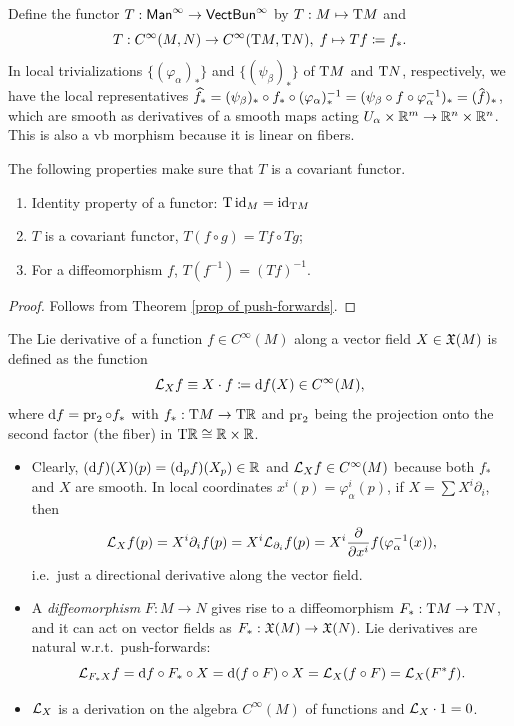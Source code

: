 \begin{defn}
Define the functor $T:\mathsf{Man}^\infty \to \mathsf{VectBun}^\infty$ by $T:M\mapsto \mathrm{T} M$ and \[T:C^\infty(M,N)\to C^\infty(\mathrm{T} M,\mathrm{T} N),\; f\mapsto Tf\coloneqq f_\ast.\]
In local trivializations $\{(\varphi_\alpha)_\ast\}$ and $\{(\psi_\beta)_\ast\}$ of $\mathrm{T} M$ and $\mathrm{T} N$, respectively, we have the local representatives $\widehat{ f_\ast}=(\psi_\beta)_\ast\circ f_\ast \circ (\varphi_\alpha)_\ast^{-1}=(\psi_\beta\circ f\circ\varphi_\alpha^{-1})_\ast=(\wh{f})_\ast$, which are smooth as derivatives of a smooth maps acting $U_\alpha\times \mathbb{R}^m\to \mathbb{R}^{n}\times\mathbb{R}^n$. This is also a \gls{vb} morphism because it is linear on fibers.
\end{defn}

\begin{prop}
    The following properties make sure that $T$ is a covariant functor.
\begin{enumerate}
    \item Identity property of a functor: $\mathrm{T}\operatorname{id}_M=\operatorname{id}_{\mathrm{T} M}$
    \item $T$ is a covariant functor, $T(f\circ g)=Tf\circ Tg$;
    \item For a diffeomorphism $f$, $T(f^{-1})=(Tf)^{-1}$.
\end{enumerate}
\end{prop}
\begin{proof}
    Follows from Theorem \ref{prop of push-forwards}.
\end{proof}


\begin{defn}
The Lie derivative of a function $f\in C^\infty(M)$ along a vector field $X\in\mathfrak{X}(M)$ is defined as the function \[\mathcal{L}_X f\equiv X\cdot f\coloneqq {\mathrm{d}} f (X)\in C^\infty(M),\] where ${\mathrm{d}} f=\operatorname{pr}_2\circ f_\ast$ with $f_\ast:\mathrm{T} M\to \mathrm{T}\mathbb{R} $ and $\operatorname{pr}_2$ being the projection onto the second factor (the fiber) in $\mathrm{T}\mathbb{R} \cong \mathbb{R} \times\mathbb{R} $. \label{def of Lie derivative}
\end{defn}

\begin{itemize}
    \item Clearly, $({\mathrm{d}} f)(X)(p)=({\mathrm{d}}_p f)(X_p)\in \mathbb{R} $ and $\mathcal{L}_X f\in C^\infty (M)$ because both $f_\ast$ and $X$ are smooth. In local coordinates $x^i(p)=\varphi_\alpha^i(p)$, if $X=\sum X^i \partial_i$, then 
    \[\mathcal{L}_X f(p)=X^i\partial_i f(p)=X^i\mathcal{L}_{\partial_i}f(p)=X^i \frac{\partial}{\partial x^i}f(\varphi_\alpha^{-1}(x)),\]
    i.e.\ just a directional derivative along the vector field.
    \item A \emph{diffeomorphism} $F:M\to N$ gives rise to a diffeomorphism $F_\ast:\mathrm{T} M\to \mathrm{T} N$, and it can act on vector fields as $F_\ast :\mathfrak{X}(M)\to \mathfrak{X}(N)$. Lie derivatives are natural w.r.t.\ push-forwards: 
    \[
    \mathcal{L}_{F_\ast X}f={\mathrm{d}} f\circ F_\ast\circ X={\mathrm{d}} (f\circ F)\circ X=\mathcal{L}_X (f\circ F)=\mathcal{L}_X (F^\ast f).
    \]
    \item $\mathcal{L}_X$ is a derivation on the algebra $C^\infty(M)$ of functions and $\mathcal{L}_X\cdot 1=0$.
\end{itemize}


